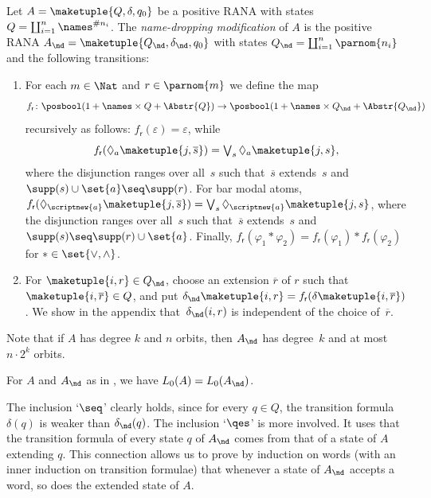 \documentclass[10pt, final, conference, a4paper, twocolumn]{IEEEtran}
\renewcommand{\enquote}[1]{`#1'}
\begin{document}
\begin{construction}\label{constr:name-dropping}
  Let $A = \maketuple{Q, \delta, q_0}$ be a positive RANA 
  with states $Q = \coprod_{i=1}^n \names^{\# n_i}$. The
  \emph{name-dropping modification} of $A$ is the positive RANA $A_{\nd} = \maketuple{Q_{\nd},
  \delta_{\nd}, q_0}$ with states $Q_{\nd} = \coprod_{i=1}^n \parnom{n_i}$ and the following transitions:
  \begin{enumerate}
    \item For each $m\in \Nat$ and $r\in \parnom{m}$ we define the map
      \[f_{\mathsf{r}}\colon \posbool(1 + \names \times Q + \Abstr{Q}) \to
      \posbool(1 + \names \times Q_{\nd} + \Abstr{Q_{\nd}})\]
      recursively as follows: $f_{\mathsf{r}}(\varepsilon) = \varepsilon$, while
      \[\textstyle  f_\mathsf{r}(\Diamond_a \maketuple{j, \overline{s}}) = \bigvee_{s}
      \Diamond_a \maketuple{j, s},\] where the disjunction ranges over
      all~$s$ such that~$\overline{s}$ extends~$s$ and
      $\supp(s) \cup \set{a} \seq \supp(r)$.
      For bar modal atoms,
      $f_{\mathsf{r}}(\Diamond_{\scriptnew{a}} \maketuple{j, \overline{s}}) =
      \bigvee_s \Diamond_{\scriptnew{a}} \maketuple{j, s}$, where the
      disjunction ranges over all~$s$ such that~$\overline{s}$
      extends~$s$ and $\supp(s) \seq \supp(r) \cup \set{a}$.  Finally,
      $f_{\mathsf{r}}(\varphi_1 \ast \varphi_2) = f_{\mathsf{r}}(\varphi_1) \ast
      f_{\mathsf{r}}(\varphi_2)$ for $\ast \in \set{\vee, \wedge}$.
\item For $\maketuple{i, r} \in Q_{\nd}$, choose an extension $\overline{r}$
      of $r$ such that
      $\maketuple{i, \overline{r}} \in Q$, and put
      $\delta_{\nd}\maketuple{i,r}=f_{\mathsf{r}}(\delta\maketuple{i,\overline{r}})$. We show in
      the appendix that~$\delta_{\nd}(i,r)$ is
      independent of the choice of~$\overline{r}$.
  \end{enumerate} 
Note that if $A$ has degree $k$ and $n$ orbits, then $A_{\nd}$ has degree~$k$ and
  at most $n \cdot 2^k$ orbits.
\end{construction}


\begin{theo}\label{thm:relAAnd}
For $A$ and $A_{\nd}$ as in , we have $L_0(A)=L_0(A_{\nd})$.
\end{theo}
\begin{IEEEproof}
  The inclusion \enquote{$\seq$} clearly holds, since for every $q\in Q$, the transition formula $\delta(q)$ is weaker than $\delta_{\nd}(q)$.
  The inclusion \enquote{$\qes$} is more involved. It uses that the transition formula
  of every state $q$ of $A_{\nd}$ comes from that of a state of $A$ extending $q$. This connection allows us to prove by  induction on words (with an inner induction on transition formulae) that whenever a state of $A_{\nd}$ accepts a word, so does the extended state of $A$.
\end{IEEEproof}
\end{document}
